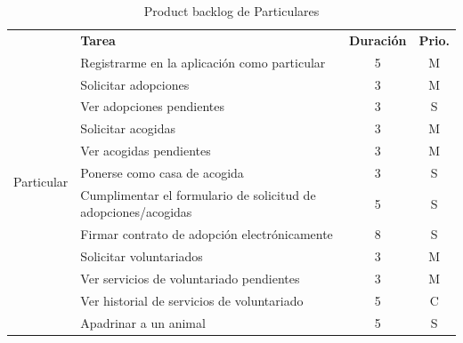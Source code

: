\begin{table}[H]
	\centering
	\begin{tabular}{|c |p{8cm}|c |c|} \hline 
		\multirow[c]{14}{*}{Particular}&  \textbf{Tarea}&  \textbf{Duración}& \textbf{Prio.}\\  \cline{2-4}
		&  Registrarme en la aplicación como particular&  5& M\\ \cline{2-4} 
		
		
		&  Solicitar adopciones&  3& M\\ \cline{2-4}
		&  Ver adopciones pendientes&  3& S\\ \cline{2-4}
		
		&  Solicitar acogidas&  3& M\\ \cline{2-4} 
		&  Ver acogidas pendientes&  3& M\\ \cline{2-4}
		
		&  Ponerse como casa de acogida&  3& S\\ \cline{2-4}
		
		&  Cumplimentar el formulario de solicitud de adopciones/acogidas &  5& S\\ \cline{2-4}
		&  Firmar contrato de adopción electrónicamente&  8& S\\ \cline{2-4}
		
		
		&  Solicitar voluntariados&  3& M\\ \cline{2-4} 
		&  Ver servicios de voluntariado pendientes&  3& M\\ \cline{2-4}
		&  Ver historial de servicios de voluntariado&  5& C\\ \cline{2-4}
		
		
		& Apadrinar a un animal&  5& S\\ \hline
		
		
		
	\end{tabular}
	\caption{Product backlog de Particulares}
	\label{tab:pb_particulares}
\end{table}

